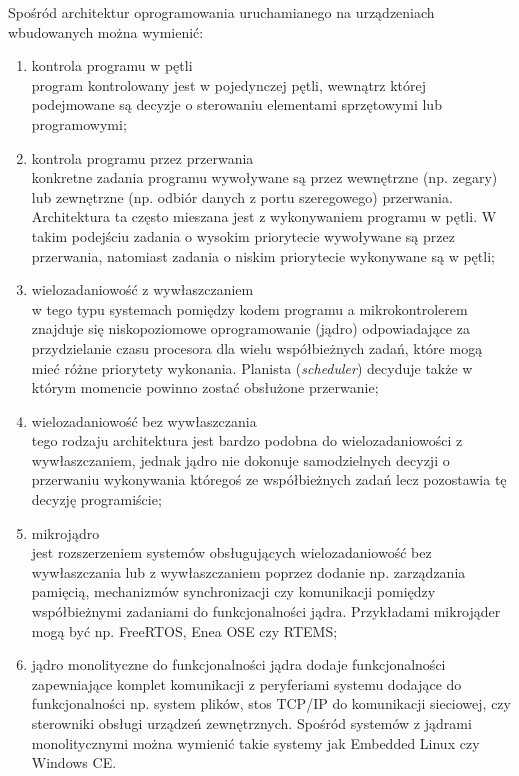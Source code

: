 \label{ref:architektury}
Spośród architektur oprogramowania uruchamianego na urządzeniach wbudowanych można wymienić:
\begin{enumerate}
\item kontrola programu w pętli \\
program kontrolowany jest w pojedynczej pętli, wewnątrz której podejmowane są decyzje o sterowaniu elementami sprzętowymi lub programowymi;
\item kontrola programu przez przerwania \\
konkretne zadania programu wywoływane są przez wewnętrzne (np. zegary) lub zewnętrzne (np. odbiór danych z portu szeregowego) przerwania.
Architektura ta często mieszana jest z wykonywaniem programu w pętli. W takim podejściu zadania o wysokim priorytecie wywoływane są przez przerwania, natomiast zadania o niskim priorytecie wykonywane są w pętli;
\item wielozadaniowość z wywłaszczaniem \\
w tego typu systemach pomiędzy kodem programu a mikrokontrolerem znajduje się niskopoziomowe oprogramowanie (jądro) odpowiadające za przydzielanie czasu procesora dla wielu współbieżnych zadań, które mogą mieć różne priorytety wykonania. Planista (\emph{scheduler}) decyduje także w którym momencie powinno zostać obsłużone przerwanie;
\item wielozadaniowość bez wywłaszczania \\
tego rodzaju architektura jest bardzo podobna do wielozadaniowości z wywłaszczaniem, jednak jądro nie dokonuje samodzielnych decyzji o przerwaniu wykonywania któregoś ze współbieżnych zadań lecz pozostawia tę decyzję programiście;
\item mikrojądro \\
jest rozszerzeniem systemów obsługujących wielozadaniowość bez wywłaszczania lub z wywłaszczaniem poprzez dodanie np. zarządzania pamięcią, mechanizmów synchronizacji czy komunikacji pomiędzy współbieżnymi zadaniami do funkcjonalności jądra. Przykładami mikrojąder mogą być np. FreeRTOS, Enea OSE czy RTEMS;
\item jądro monolityczne
do funkcjonalności jądra dodaje funkcjonalności zapewniające komplet komunikacji z peryferiami systemu dodające do funkcjonalności np. system plików, stos TCP/IP do komunikacji sieciowej, czy sterowniki obsługi urządzeń zewnętrznych.
Spośród systemów z jądrami monolitycznymi można wymienić takie systemy jak Embedded Linux czy Windows CE.
\end{enumerate}

